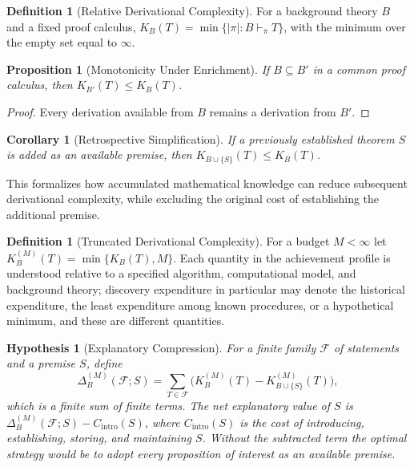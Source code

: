 \documentclass[11pt,letterpaper]{report}
\theoremstyle{plain}
\newtheorem{proposition}[theorem]{Proposition}
\newtheorem{corollary}[theorem]{Corollary}
\newtheorem{hypothesis}[theorem]{Hypothesis}
\theoremstyle{definition}
\newtheorem{definition}[theorem]{Definition}
\theoremstyle{remark}
\begin{document}
\begin{definition}[Relative Derivational Complexity]\label{def:derivcomp}
For a background theory $B$ and a fixed proof calculus, $K_B(T)=\min\{|\pi|:B\vdash_\pi T\}$, with the minimum over the empty set equal to $\infty$.
\end{definition}

\begin{proposition}[Monotonicity Under Enrichment]\label{pr:monoenrich}
If $B\subseteq B'$ in a common proof calculus, then $K_{B'}(T)\le K_B(T)$.
\end{proposition}
\begin{proof}
Every derivation available from $B$ remains a derivation from $B'$.
\end{proof}

\begin{corollary}[Retrospective Simplification]
If a previously established theorem $S$ is added as an available premise, then $K_{B\cup\{S\}}(T)\le K_B(T)$.
\end{corollary}

This formalizes how accumulated mathematical knowledge can reduce subsequent derivational complexity, while excluding the original cost of establishing the additional premise.

\begin{definition}[Truncated Derivational Complexity]
For a budget $M<\infty$ let $K_B^{(M)}(T)=\min\{K_B(T),M\}$. Each quantity in the achievement profile is understood relative to a specified algorithm, computational model, and background theory; discovery expenditure in particular may denote the historical expenditure, the least expenditure among known procedures, or a hypothetical minimum, and these are different quantities.
\end{definition}

\begin{hypothesis}[Explanatory Compression]\label{hy:explcomp}
For a finite family $\mathcal F$ of statements and a premise $S$, define
\[
\Delta_B^{(M)}(\mathcal F;S)=\sum_{T\in\mathcal F}\bigl(K_B^{(M)}(T)-K_{B\cup\{S\}}^{(M)}(T)\bigr),
\]
which is a finite sum of finite terms. The net explanatory value of $S$ is $\Delta_B^{(M)}(\mathcal F;S)-C_{\mathrm{intro}}(S)$, where $C_{\mathrm{intro}}(S)$ is the cost of introducing, establishing, storing, and maintaining $S$. Without the subtracted term the optimal strategy would be to adopt every proposition of interest as an available premise.
\end{hypothesis}
\end{document}
